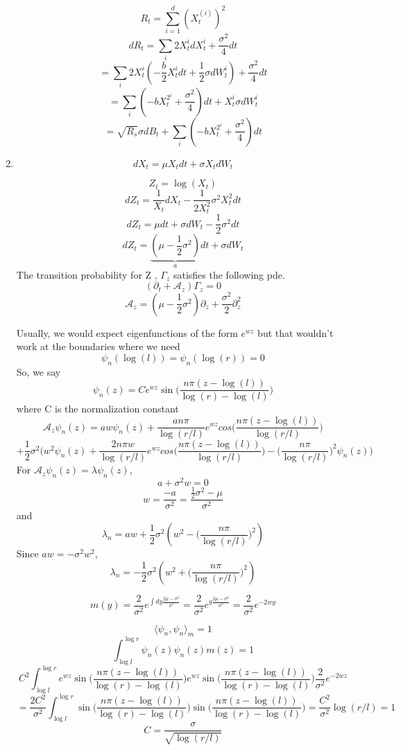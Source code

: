 \documentclass[a4paper,11pt]{article}
\begin{document}
\begin{enumerate}
\[R_t = \sum_{i=1}^d(X_t^{(i)})^2\]
\[dR_t = \sum_i 2X_t^{i}dX_t^{i} + \frac{\sigma^2}{4}dt\]
\[ = \sum_i 2X_t^{i}(-\frac{b}{2}X_t^{i}dt+ \frac{1}{2} \sigma dW_t^i) + \frac{\sigma^2}{4}dt\]
\[ = \sum_i (-bX_t^{2^i} + \frac{\sigma^2}{4}) dt + X_t^{i}\sigma dW_t^i\]
\[ = \sqrt{R_s}\sigma dB_t +\sum_i (-bX_t^{2^i} + \frac{\sigma^2}{4}) dt \]


\item 

\[dX_t  = \mu X_tdt + \sigma X_t dW_t\]

\[Z_t = \log(X_t)\]
\[dZ_t = \frac{1}{X_t}dX_t-\frac{1}{2X_t^2}\sigma^2X_t^2dt\]
\[dZ_t = \mu dt + \sigma  dW_t-\frac{1}{2}\sigma^2dt\]
\[dZ_t = \underbrace{(\mu -\frac{1}{2}\sigma^2)}_a dt + \sigma  dW_t\]
The transition probability for Z , $\Gamma_z$ satisfies the following pde.
\[(\partial_t + \mathcal{A}_z)\Gamma_z =0 \]
\[\mathcal{A}_z= (\mu -\frac{1}{2}\sigma^2) \partial_z + \frac{\sigma^2}{2}\partial_z^2\]


Usually, we would expect eigenfunctions of the form $e^{wz}$ but that wouldn't work at the boundaries where we need 
\[\psi_n(\log(l))=\psi_n(\log(r))=0\]
So, we say 
\[\psi_n(z)=Ce^{wz} \sin\bigg(\frac{n\pi (z - \log(l))}{\log(r)-\log(l)}\bigg)\]
where C is the normalization constant
\[\mathcal{A}_z\psi_n(z)= aw\psi_n(z)+ \frac{a n\pi}{\log(r/l)} e^{wz} cos \bigg(\frac{n\pi (z - \log(l))}{\log(r/l)}\bigg)\]
\[+ \frac{1}{2}\sigma^2\bigg( w^2\psi_n(z)+ \frac{2n\pi w}{\log(r/l)} e^{wz} cos \bigg(\frac{n\pi (z - \log(l))}{\log(r/l)}\bigg)- \bigg(\frac{ n\pi}{\log(r/l)}\bigg)^2\psi_n(z)\bigg)\]
For $\mathcal{A}_z\psi_n(z)= \lambda \psi_n(z)$,
\[a+\sigma^2w=0\]
\[w= \frac{-a}{\sigma^2}= \frac{\frac{1}{2}\sigma^2-\mu}{\sigma^2}\]
and 
\[\lambda_n= aw+\frac{1}{2}\sigma^2(w^2-\bigg(\frac{ n\pi}{\log(r/l)}\bigg)^2)\]
Since $aw  = - \sigma^2 w^2$,
\[\lambda_n=- \frac{1}{2}\sigma^2(w^2+\bigg(\frac{ n\pi}{\log(r/l)}\bigg)^2)\]

\[m(y)= \frac{2}{\sigma^2} e^{\int dy \frac{2\mu -\sigma^2}{\sigma^2}}= \frac{2}{\sigma^2} e^{y \frac{2\mu -\sigma^2}{\sigma^2}} = \frac{2}{\sigma^2}e^{-2wy}\]

\[\langle \psi_n,\psi_n\rangle_m =1\]
\[\int_{\log{l}}^{\log{r}} \psi_n(z) \psi_n(z) m(z)= 1\]
\[C^2 \int_{\log{l}}^{\log{r}} e^{wz} \sin\bigg(\frac{n\pi (z - \log(l))}{\log(r)-\log(l)}\bigg) e^{wz} \sin\bigg(\frac{n\pi (z - \log(l))}{\log(r)-\log(l)}\bigg)\frac{2}{\sigma^2}e^{-2wz} \]
\[=\frac{2C^2}{\sigma^2} \int_{\log{l}}^{\log{r}} \sin\bigg(\frac{n\pi (z - \log(l))}{\log(r)-\log(l)}\bigg)   \sin\bigg(\frac{n\pi (z - \log(l))}{\log(r)-\log(l)}\bigg) = \frac{C^2}{\sigma^2}\log(r/l) =1\]
\[C = \frac{\sigma}{\sqrt{\log(r/l)}}\]


\end{enumerate}
\end{document}
